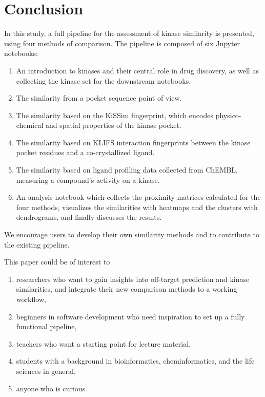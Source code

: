 \documentclass[9pt,training]{livecoms}
\begin{document}
\section{Conclusion}
In this study, a full pipeline for the assessment of kinase similarity is presented, using four methods of comparison. The pipeline is composed of six Jupyter notebooks:
\begin{enumerate}
    \item An introduction to kinases and their central role in drug discovery, as well as collecting the kinase set for the downstream notebooks.
    \item The similarity from a pocket sequence point of view.
    \item The similarity based on the KiSSim fingerprint, which encodes physico-chemical and spatial properties of the kinase pocket.
    \item The similarity based on KLIFS interaction fingerprints between the kinase pocket residues and a co-crystallized ligand.
    \item The similarity based on ligand profiling data collected from ChEMBL, measuring a compound's activity on a kinase.
    \item An analysis notebook which collects the proximity matrices calculated for the four methods, visualizes the similarities with heatmaps and the clusters with dendrograms, and finally discusses the results.
\end{enumerate}

We encourage users to develop their own similarity methods and to contribute to the existing pipeline.

This paper could be of interest to
\begin{enumerate}
    \item researchers who want to gain insights into off-target prediction and kinase similarities, and integrate their new comparison methods to a working workflow,
    \item beginners in software development who need inspiration to set up a fully functional pipeline,
    \item teachers who want a starting point for lecture material,
    \item students with a background in bioinformatics, cheminformatics, and the life sciences in general,
    \item anyone who is curious.
\end{enumerate}
\end{document}
